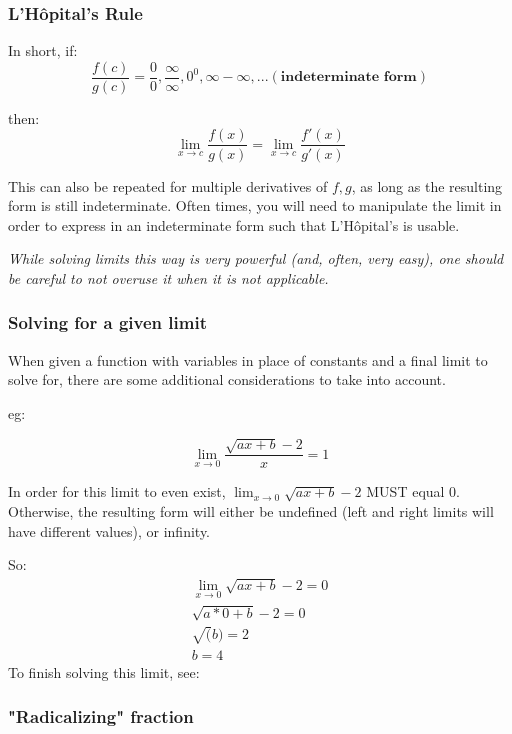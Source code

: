 \documentclass[12pt]{article}
\begin{document}
\subsubsection{L'Hôpital's Rule}

\begin{shaded}
In short, if:
$$\frac{f(c)}{g(c)} = \frac{0}{0}, \frac{\infty}{\infty}, 0^0, \infty - \infty, ... (\textbf{indeterminate form})$$ 

then:
$$\lim_{x\to c}\frac{f(x)}{g(x)} = \lim_{x\to c}\frac{f'(x)}{g'(x)}$$
\end{shaded}
This can also be repeated for multiple derivatives of $f, g$, as long as the resulting form is still indeterminate. Often times, you will need to manipulate the limit in order to express in an indeterminate form such that L'Hôpital's is usable.

\textit{While solving limits this way is very powerful (and, often, very easy), one should be careful to not overuse it when it is not applicable.}

\subsubsection{Solving for a given limit}

When given a function with variables in place of constants and a final limit to solve for, there are some additional considerations to take into account.

eg:

$$\lim_{x\to0}\frac{\sqrt{ax + b} - 2}{x} = 1$$

In order for this limit to even exist, $\lim_{x\to0} \sqrt{ax + b} - 2$ MUST equal 0. Otherwise, the resulting form will either be undefined (left and right limits will have different values), or infinity.

So:
\begin{equation}
\begin{split}
    \lim_{x\to0} \sqrt{ax + b} - 2 = 0\\
    \sqrt{a*0 + b} - 2 = 0\\
    \sqrt(b) = 2\\
    b = 4
\end{split}
\end{equation}
To finish solving this limit, see:

\subsubsection{"Radicalizing" fraction}
\end{document}
